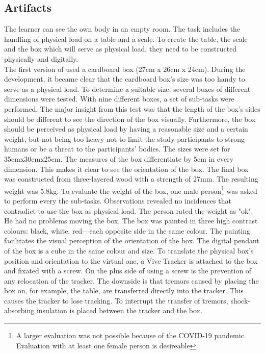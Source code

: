 \subsection{Artifacts}
The learner can see the own body in an empty room. The task includes the handling of physical load on a table and a scale. To create the table, the scale and the box which will serve as physical load, they need to be constructed physically and digitally.\\
The first version of \exgo used a cardboard box (27cm x 26cm x 24cm). During the development, it became clear that the cardboard box's size was too handy to serve as a physical load. To determine a suitable size, several boxes of different dimensions were tested. With nine different boxes, a set of sub-tasks were performed. The major insight from this test was that the length of the box's sides should be different to see the direction of the box visually. Furthermore, the box should be perceived as physical load by having a reasonable size and a certain weight, but not being too heavy not to limit the study participants to strong humans or be a threat to the participants' bodies. The sizes were set for 35cmx30cmx25cm. The measures of the box differentiate by 5cm in every dimension. This makes it clear to see the orientation of the box. The final box was constructed from three-layered wood with a strength of 27mm. The resulting weight was 5.8kg. To evaluate the weight of the box, one male person\footnote{A larger evaluation was not possible because of the COVID-19 pandemic. Evaluation with at least one female person is desireable} was asked to perform every the sub-tasks. Observations revealed no incidences that contradict to use the box as physical load. The person rated the weight as "ok". He had no problems moving the box. The box was painted in three high contrast colours: black, white, red—each opposite side in the same colour. The painting facilitates the visual perception of the orientation of the box. The digital pendant of the box is a cube in the same colour and size. To translate the physical box's position and orientation to the virtual one, a Vive Tracker is attached to the box and fixated with a screw. On the plus side of using a screw is the prevention of any relocation of the tracker. The downside is that tremors caused by placing the box on, for example, the table, are transferred directly into the tracker. This causes the tracker to lose tracking. To interrupt the transfer of tremors, shock-absorbing insulation is placed between the tracker and the box.\\
